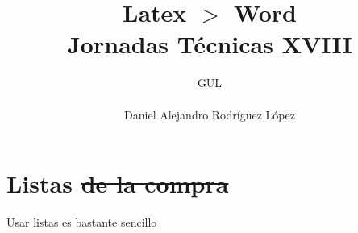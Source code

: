 \documentclass[10pt,a4paper,titlepage]{article} %
\title{ \textbf{ \Huge{Latex $>$ Word}} \\ Jornadas Técnicas XVIII}
\author{
		\begin{tabular}{l}
			\multicolumn{1}{l}{GUL} \\ \hline \\
			Daniel Alejandro Rodríguez López \\
		\end{tabular}
}
\begin{document}
\maketitle

\newpage

\section*{Listas \sout{de la compra}}
	Usar listas es bastante sencillo
\end{document}

